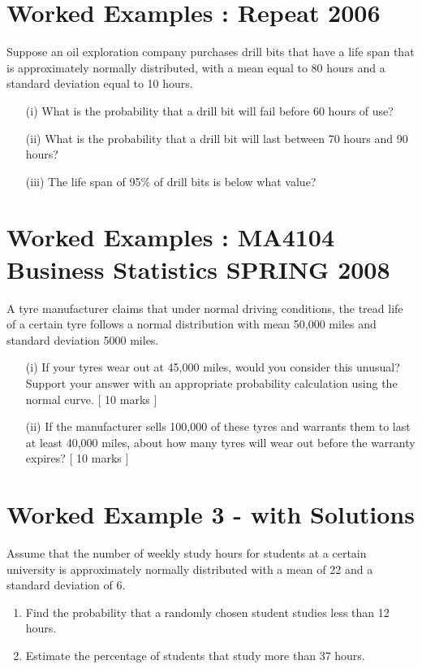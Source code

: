 \documentclass[]{report}
\begin{document}
	\section{Worked Examples : Repeat 2006}
	Suppose an oil exploration company purchases drill bits that have a life span that is approximately normally distributed, with a mean equal to 80 hours and a standard deviation equal to 10 hours.
	
	\begin{itemize}
		\item[(i)]	What is the probability that a drill bit will fail before 60 hours of use?
		
		\item[(ii)]	What is the probability that a drill bit will last between 70 hours and 90 hours?
		
		\item[(iii)]	The life span of 95\% of drill bits is below what value?
		
	\end{itemize}
	
	
	\section{Worked Examples : MA4104 Business Statistics SPRING 2008}
	
	A tyre manufacturer claims that under normal driving conditions, the tread life of a certain tyre follows a normal distribution with mean 50,000 miles and standard deviation 5000 miles. 
	
	\begin{itemize}
		\item[(i)] If your tyres wear out at 45,000 miles, would you consider this unusual? Support your answer with an appropriate probability calculation using the normal curve. [ 10 marks ] 
		
		\item[(ii)] If the manufacturer sells 100,000 of these tyres and warrants them to last at least 40,000 miles, about how many tyres will wear out before the warranty expires? [ 10 marks ] 
	\end{itemize}
\section{Worked Example 3 - with Solutions}
Assume that the number of weekly study hours for students at a certain university
is approximately normally distributed with a mean of 22 and a standard deviation
of 6.
\begin{enumerate}
	\item Find the probability that a randomly chosen student studies less than 12
	hours.
	\item Estimate the percentage of students that study more than 37 hours.
\end{enumerate}
\end{document}
